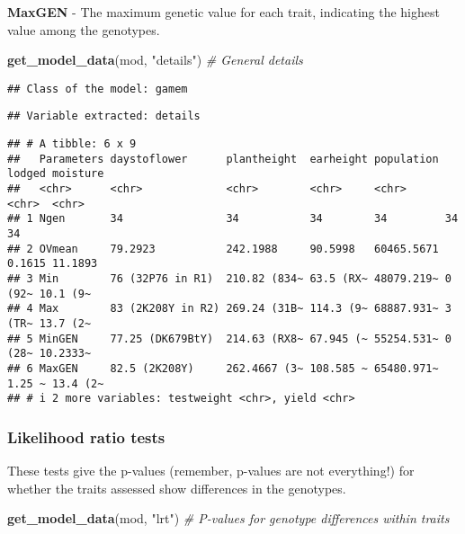 \documentclass[
]{article}
\newenvironment{Shaded}{\begin{snugshade}}{\end{snugshade}}
\newcommand{\CommentTok}[1]{\textcolor[rgb]{0.56,0.35,0.01}{\textit{#1}}}
\newcommand{\FunctionTok}[1]{\textcolor[rgb]{0.13,0.29,0.53}{\textbf{#1}}}
\newcommand{\NormalTok}[1]{#1}
\newcommand{\StringTok}[1]{\textcolor[rgb]{0.31,0.60,0.02}{#1}}
\begin{document}
\textbf{MaxGEN} - The maximum genetic value for each trait, indicating
the highest value among the genotypes.

\begin{Shaded}
\begin{Highlighting}[]
\FunctionTok{get\_model\_data}\NormalTok{(mod, }\StringTok{"details"}\NormalTok{) }\CommentTok{\# General details}
\end{Highlighting}
\end{Shaded}

\begin{verbatim}
## Class of the model: gamem
\end{verbatim}

\begin{verbatim}
## Variable extracted: details
\end{verbatim}

\begin{verbatim}
## # A tibble: 6 x 9
##   Parameters daystoflower      plantheight  earheight population lodged moisture
##   <chr>      <chr>             <chr>        <chr>     <chr>      <chr>  <chr>   
## 1 Ngen       34                34           34        34         34     34      
## 2 OVmean     79.2923           242.1988     90.5998   60465.5671 0.1615 11.1893 
## 3 Min        76 (32P76 in R1)  210.82 (834~ 63.5 (RX~ 48079.219~ 0 (92~ 10.1 (9~
## 4 Max        83 (2K208Y in R2) 269.24 (31B~ 114.3 (9~ 68887.931~ 3 (TR~ 13.7 (2~
## 5 MinGEN     77.25 (DK679BtY)  214.63 (RX8~ 67.945 (~ 55254.531~ 0 (28~ 10.2333~
## 6 MaxGEN     82.5 (2K208Y)     262.4667 (3~ 108.585 ~ 65480.971~ 1.25 ~ 13.4 (2~
## # i 2 more variables: testweight <chr>, yield <chr>
\end{verbatim}

\subsubsection{Likelihood ratio tests}\label{likelihood-ratio-tests}

These tests give the p-values (remember, p-values are not everything!)
for whether the traits assessed show differences in the genotypes.

\begin{Shaded}
\begin{Highlighting}[]
\FunctionTok{get\_model\_data}\NormalTok{(mod, }\StringTok{"lrt"}\NormalTok{) }\CommentTok{\# P{-}values for genotype differences within traits}
\end{Highlighting}
\end{Shaded}
\end{document}
